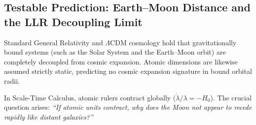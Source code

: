\documentclass[11pt,a4paper]{article}
\begin{document}
\subsection{Testable Prediction: Earth--Moon Distance and the LLR Decoupling Limit}
\label{sec:llr_ongoru}

Standard General Relativity and $\Lambda$CDM cosmology hold that gravitationally bound systems (such as the Solar System and the Earth--Moon orbit) are completely decoupled from cosmic expansion. Atomic dimensions are likewise assumed strictly static, predicting no cosmic expansion signature in bound orbital radii.

In Scale-Time Calculus, atomic rulers contract globally ($\dot{\lambda}/\lambda = -H_0$). The crucial question arises: \textit{``If atomic units contract, why does the Moon not appear to recede rapidly like distant galaxies?''}
\end{document}
